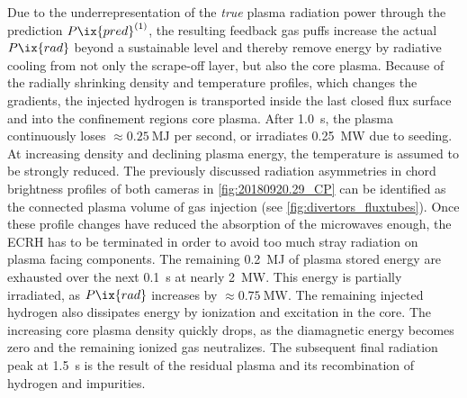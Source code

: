             Due to the underrepresentation of the \textit{true} plasma radiation power through the prediction $P\ix{pred}^{\left(1\right)}$, the resulting feedback gas puffs increase the actual $P\ix{rad}$ beyond a sustainable level and thereby remove energy by radiative cooling from not only the scrape-off layer, but also the core plasma. Because of the radially shrinking density and temperature profiles, which changes the gradients, the injected hydrogen is transported inside the last closed flux surface and into the confinement regions core plasma. After \SI{1.0}{\second}, the plasma continuously loses $\approx\SI{0.25}{\mega\joule}$ per second, or irradiates \SI{0.25}{\mega\watt} due to seeding. At increasing density and declining plasma energy, the temperature is assumed to be strongly reduced. The previously discussed radiation asymmetries in chord brightness profiles of both cameras in \cref{fig:20180920.29_CP} can be identified as the connected plasma volume of gas injection (see \cref{fig:divertors_fluxtubes}). Once these profile changes have reduced the absorption of the microwaves enough, the ECRH has to be terminated in order to avoid too much stray radiation on plasma facing components. The remaining \SI{0.2}{\mega\joule} of plasma stored energy are exhausted over the next \SI{0.1}{\second} at nearly \SI{2}{\mega\watt}. This energy is partially irradiated, as $P\ix{rad}$ increases by $\approx\SI{0.75}{\mega\watt}$. The remaining injected hydrogen also dissipates energy by ionization and excitation in the core. The increasing core plasma density quickly drops, as the diamagnetic energy becomes zero and the remaining ionized gas neutralizes. The subsequent final radiation peak at \SI{1.5}{\second} is the result of the residual plasma and its recombination of hydrogen and impurities.\\%

